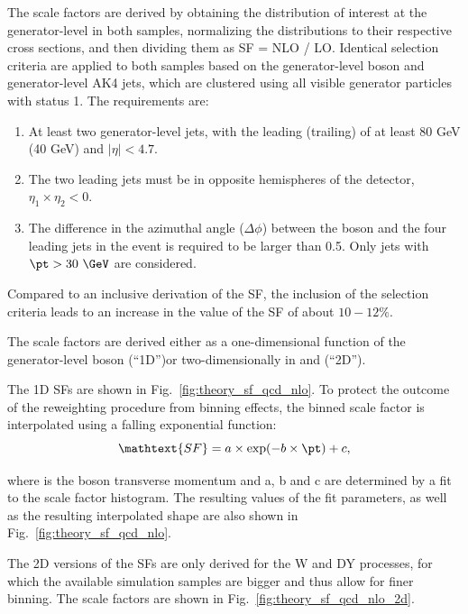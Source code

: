 The scale factors are derived by obtaining the distribution of interest at the generator-level in both samples, normalizing the distributions to their respective cross sections, and then dividing them as SF = NLO / LO. Identical selection criteria are applied to both samples based on the generator-level boson and generator-level AK4 jets, which are clustered using all visible generator particles with status 1. The requirements are:

\begin{enumerate}
\item At least two generator-level jets, with the leading (trailing) \pt of at least 80 GeV (40 GeV) and $|\eta|<4.7$.
\item The two leading jets must be in opposite hemispheres of the detector, $\eta_{1}\times \eta_{2}<0$.
\item The difference in the azimuthal angle ($\Delta\phi$) between the boson and the four leading jets in the event is required to be larger than 0.5. Only jets with $\pt>30~\GeV$ are considered.
\end{enumerate}

Compared to an inclusive derivation of the SF, the inclusion of the selection criteria leads to an increase in the value of the SF of about $10-12\%$.


The scale factors are derived either as a one-dimensional function of the generator-level boson \ptv (``1D'')or two-dimensionally in \ptv and \mjj (``2D'').

The 1D SFs are shown in Fig.~\ref{fig:theory_sf_qcd_nlo}. To protect the outcome of the reweighting procedure from binning effects, the binned scale factor is interpolated using a falling exponential function:
\begin{equation}
\mathtext{SF} = a\times \exp(-b\times\pt) + c,
\end{equation}

where \pt is the boson transverse momentum and a, b and c are determined by a fit to the scale factor histogram. The resulting values of the fit parameters, as well as the resulting interpolated shape are also shown in Fig.~\ref{fig:theory_sf_qcd_nlo}.

The 2D versions of the SFs are only derived for the W and DY processes, for which the available simulation samples are bigger and thus allow for finer binning. The scale factors are shown in Fig.~\ref{fig:theory_sf_qcd_nlo_2d}.


